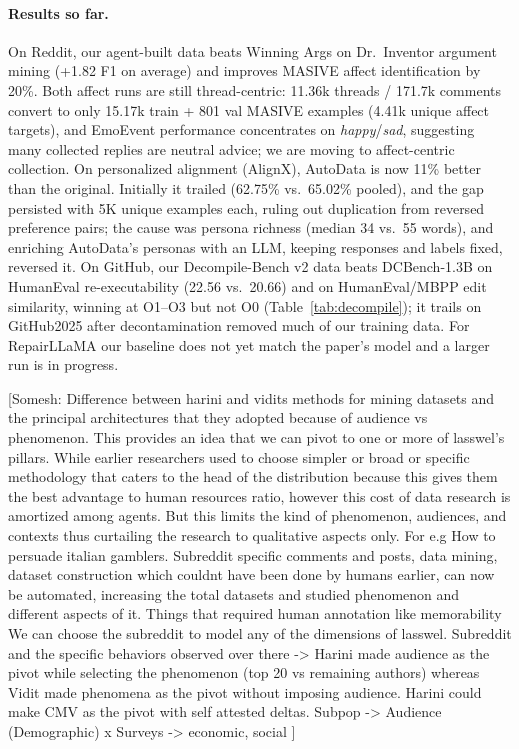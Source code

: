 \documentclass{article}
\newcommand{\somesh}[1]{{\color{blue}[Somesh: #1]}}
\begin{document}
\paragraph{Results so far.} On Reddit, our agent-built data beats Winning Args on Dr.~Inventor argument mining
(+1.82 F1 on average) and improves MASIVE affect identification by 20\%. Both affect runs are still thread-centric:
11.36k threads / 171.7k comments convert to only 15.17k train + 801 val MASIVE examples (4.41k unique affect
targets), and EmoEvent performance concentrates on \emph{happy}/\emph{sad}, suggesting many collected replies are
neutral advice; we are moving to affect-centric collection. On personalized alignment (AlignX), AutoData is now 11\% better than the original.
Initially it trailed (62.75\% vs.\ 65.02\% pooled), and the gap persisted with 5K unique examples each, ruling out
duplication from reversed preference pairs; the cause was persona richness (median 34 vs.\ 55 words), and enriching
AutoData's personas with an LLM, keeping responses and labels fixed, reversed it. On GitHub, our Decompile-Bench v2 data
beats DCBench-1.3B on HumanEval re-executability (22.56 vs.\ 20.66) and on HumanEval/MBPP edit similarity, winning at
O1--O3 but not O0 (Table~\ref{tab:decompile}); it trails on GitHub2025 after decontamination removed much of our
training data. For RepairLLaMA our baseline does not yet match the paper's model and a larger run is in progress.

\somesh{
Difference between harini and vidits methods for mining datasets and the principal architectures that they adopted because of audience vs phenomenon. This provides an idea that we can pivot to one or more of lasswel's pillars. While earlier researchers used to choose simpler or broad or specific methodology that caters to the head of the distribution because this gives them the best advantage to human resources ratio, however this cost of data research is amortized among agents. But this limits the kind of phenomenon, audiences, and contexts thus curtailing the research to qualitative aspects only. For e.g How to persuade italian gamblers. Subreddit specific comments and posts, data mining, dataset construction which couldnt have been done by humans earlier, can now be automated, increasing the total datasets and studied phenomenon and different aspects of it. Things that required human annotation like memorability We can choose the subreddit to model any of the dimensions of lasswel.
Subreddit and the specific behaviors observed over there -> Harini made audience as the pivot while selecting the phenomenon (top 20 vs remaining authors) whereas Vidit made phenomena as the pivot without imposing audience. Harini could make CMV as the pivot with self attested deltas. 
Subpop -> Audience (Demographic) x Surveys -> economic, social
}








\end{document}
